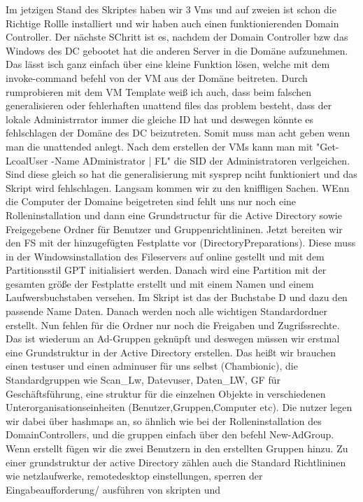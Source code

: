 \documentclass[conference]{IEEEtran}
\begin{document}
Im jetzigen Stand des Skriptes haben wir 3 Vms und auf zweien ist schon die Richtige Rollle installiert und wir haben auch einen funktionierenden Domain Controller. Der nächste SChritt ist es, nachdem der Domain Controller bzw das Windows des DC gebootet hat die anderen Server in die Domäne aufzunehmen. Das lässt isch ganz einfach über eine kleine Funktion lösen, welche mit dem invoke-command befehl von der VM aus der Domäne beitreten. Durch rumprobieren mit dem VM Template weiß ich auch, dass beim falschen generalisieren oder fehlerhaften unattend files das problem besteht, dass der lokale Administrrator immer die gleiche ID hat und deswegen könnte es fehlschlagen der Domäne des DC beizutreten. Somit muss man acht geben wenn man die unattended anlegt. Nach dem erstellen der VMs kann man mit "Get-LcoalUser -Name ADministrator | FL" die SID der Administratoren verlgeichen. Sind diese gleich so hat die generalisierung mit sysprep nciht funktioniert und das Skript wird fehlschlagen. Langsam kommen wir zu den kniffligen Sachen. WEnn die Computer der Domaine beigetreten sind fehlt uns nur noch eine Rolleninstallation und dann eine Grundstructur für die Active Directory sowie Freigegebene Ordner für Benutzer und Gruppenrichtlininen. 
Jetzt bereiten wir den FS mit der hinzugefügten Festplatte vor (DirectoryPreparations). Diese muss in der Windowsinstallation des Fileservers auf online gestellt und mit dem Partitionsstil GPT initialisiert werden. Danach wird eine Partition mit der gesamten größe der Festplatte erstellt und mit einem Namen und einem Laufwersbuchstaben versehen. Im Skript ist das der Buchstabe D und dazu den passende Name Daten. Danach werden noch alle wichtigen Standardordner erstellt.
Nun fehlen für die Ordner nur noch die Freigaben und Zugrifssrechte. Das ist wiederum an Ad-Gruppen geknüpft und deswegen müssen wir erstmal eine Grundstruktur in der Active Directory erstellen. Das heißt wir brauchen einen testuser und einen adminuser für uns selbst (Chambionic), die Standardgruppen wie Scan_Lw, Datevuser, Daten_LW, GF für Geschäftsführung, eine struktur für die einzelnen Objekte in verschiedenen Unterorganisationseinheiten (Benutzer,Gruppen,Computer etc). Die nutzer legen wir dabei über hashmaps an, so ähnlich wie bei der Rolleninstallation des DomainControllers, und die gruppen einfach über den befehl New-AdGroup. Wenn erstellt fügen wir die zwei Benutzern in den erstellten Gruppen hinzu. Zu einer grundstruktur der active Directory zählen auch die Standard Richtlininen wie netzlaufwerke, remotedesktop einstellungen, sperren der Eingabeaufforderung/ ausführen von skripten und 



\end{document}
